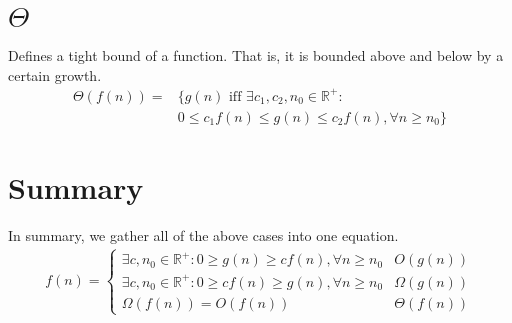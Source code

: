 \section{$\Theta$}
\label{ch:asymptoticnotation|sec:theta}
Defines a tight bound of a function. That is, it is bounded above and below by
a certain growth.
\begin{align}
	\Theta(f(n)) =
	&\{g(n) \text{ iff } \exists c_1, c_2, n_0 \in \mathbb{R}^{+} :\\
	&0 \leq c_1 f(n) \leq g(n) \leq c_2 f(n), \forall n \geq n_0 \}
	\nonumber
\end{align}

\section{Summary}
\label{ch:asymptoticnotation|sec:summary}
In summary, we gather all of the above cases into one equation.
\begin{align}
	f(n) =
	\begin{cases}
		\exists c, n_0 \in \mathbb{R}^{+}
		: 0 \geq g(n) \geq c f(n), \forall n \geq n_0 & O(g(n)) \\
		\exists c, n_0 \in \mathbb{R}^{+}
		: 0 \geq c f(n) \geq g(n), \forall n \geq n_0 & \Omega(g(n)) \\
		\Omega(f(n)) = O(f(n)) & \Theta(f(n))
	\end{cases}
\end{align}


